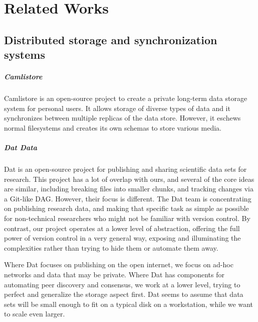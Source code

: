 \chapter{Related Works}


\section{Distributed storage and synchronization systems}

\paragraph{Camlistore}

Camlistore \cite{camlistore_homepage} is an open-source project to create a
private long-term data storage system for personal users. It allows storage of
diverse types of data and it synchronizes between multiple replicas of the data
store. However, it eschews normal filesystems and creates its own schemas to
store various media.


\paragraph{Dat Data}

Dat \cite{dat_homepage} is an open-source project for publishing and sharing
scientific data sets for research. This project has a lot of overlap with ours,
and several of the core ideas are similar, including breaking files into smaller
chunks, and tracking changes via a Git-like \gls{DAG}. However, their focus is
different. The Dat team is concentrating on publishing research data, and making
that specific task as simple as possible for non-technical researchers who might
not be familiar with version control. By contrast, our project operates at a
lower level of abstraction, offering the full power of version control in a very
general way, exposing and illuminating the complexities rather than trying to
hide them or automate them away.

Where Dat focuses on publishing on the open internet, we focus on ad-hoc
networks and data that may be private. Where Dat has components for automating
peer discovery and consensus, we work at a lower level, trying to perfect and
generalize the storage aspect first. Dat seems to assume that data sets will be
small enough to fit on a typical disk on a workstation, while we want to scale
even larger.


